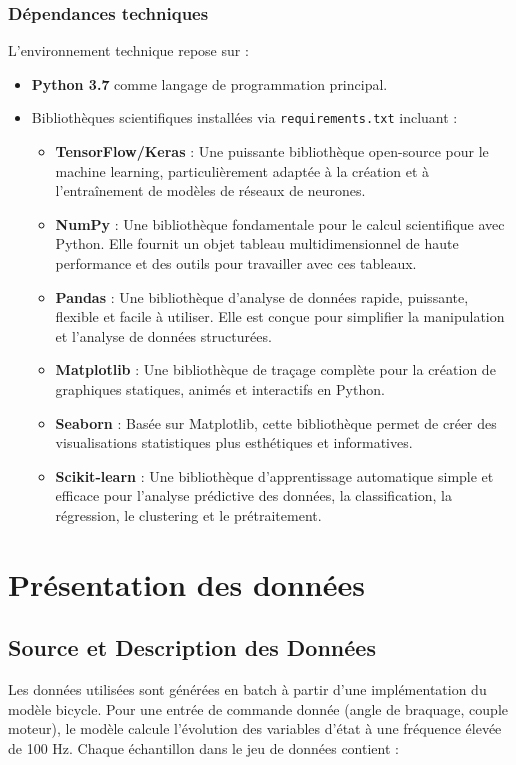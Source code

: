 \documentclass[12pt, a4paper]{report}
\begin{document}
\subsubsection{Dépendances techniques}
L'environnement technique repose sur :
\begin{itemize}
    \item \textbf{Python 3.7} comme langage de programmation principal.
    \item Bibliothèques scientifiques installées via \texttt{requirements.txt} incluant :
    \begin{itemize}
        \item \textbf{TensorFlow/Keras} : Une puissante bibliothèque open-source pour le machine learning, particulièrement adaptée à la création et à l'entraînement de modèles de réseaux de neurones.
        \item \textbf{NumPy} : Une bibliothèque fondamentale pour le calcul scientifique avec Python. Elle fournit un objet tableau multidimensionnel de haute performance et des outils pour travailler avec ces tableaux.
        \item \textbf{Pandas} : Une bibliothèque d'analyse de données rapide, puissante, flexible et facile à utiliser. Elle est conçue pour simplifier la manipulation et l'analyse de données structurées.
        \item \textbf{Matplotlib} : Une bibliothèque de traçage complète pour la création de graphiques statiques, animés et interactifs en Python.
        \item \textbf{Seaborn} : Basée sur Matplotlib, cette bibliothèque permet de créer des visualisations statistiques plus esthétiques et informatives.
        \item \textbf{Scikit-learn} : Une bibliothèque d'apprentissage automatique simple et efficace pour l'analyse prédictive des données, la classification, la régression, le clustering et le prétraitement.
    \end{itemize}
\end{itemize}
\section{Présentation des données}
\label{sec:donnees}

\subsection{Source et Description des Données}
Les données utilisées sont générées en batch à partir d'une implémentation du modèle bicycle. Pour une entrée de commande donnée (angle de braquage, couple moteur), le modèle calcule l'évolution des variables d'état à une fréquence élevée de 100 Hz. Chaque échantillon dans le jeu de données contient :
\end{document}
